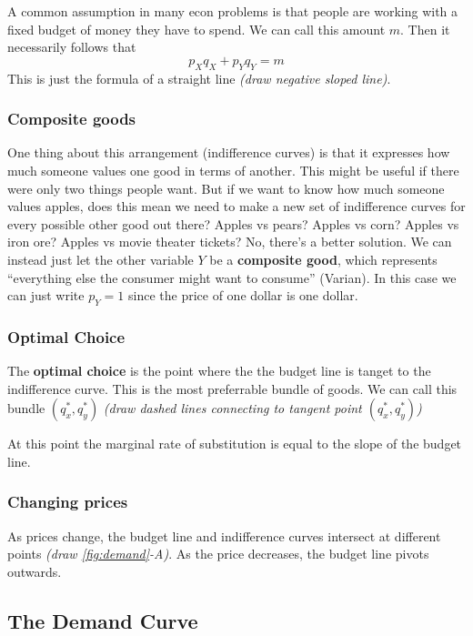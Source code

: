 \documentclass[11pt]{article}
\begin{document}
A common assumption in many econ problems is that people are working with a fixed budget of money they have to spend. We can call this amount $m$. Then it necessarily follows that
$$p_Xq_X + p_Yq_Y = m$$
This is just the formula of a straight line {\it (draw negative sloped line)}.


\subsubsection{Composite goods}
One thing about this arrangement (indifference curves) is that it expresses how much someone values one good in terms of another. This might be useful if there were only two things people want. But if we want to know how much someone values apples, does this mean we need to make a new set of indifference curves for every possible other good out there? Apples vs pears? Apples vs corn? Apples vs iron ore? Apples vs movie theater tickets? No, there's a better solution. We can instead just let the other variable $Y$ be a {\bf composite good}, which represents ``everything else the consumer might want to consume'' (Varian). In this case we can just write $p_Y = 1$ since the price of one dollar is one dollar.

\subsubsection{Optimal Choice}

The {\bf optimal choice} is the point where the the budget line is tanget to the indifference curve. This is the most preferrable bundle of goods. We can call this bundle $(q_x^*, q_y^*)$ {\it (draw dashed lines connecting to tangent point $(q_x^*, q_y^*)$)}

At this point the marginal rate of substitution is equal to the slope of the budget line.

\subsubsection{Changing prices}

As prices change, the budget line and indifference curves intersect at different points {\it (draw \ref{fig:demand}-A)}.
As the price decreases, the budget line pivots outwards.


\subsection{The Demand Curve}
\end{document}
